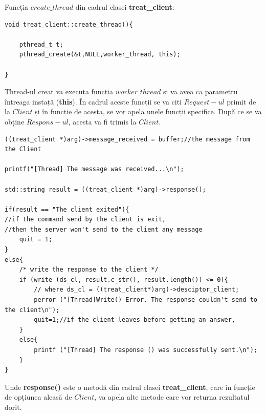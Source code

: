 \documentclass[runningheads]{llncs}
\begin{document}
Funcția $create\_thread$ din cadrul clasei \textbf{treat\_client}: 
\begin{verbatim}
void treat_client::create_thread(){
    
    pthread_t t;
    pthread_create(&t,NULL,worker_thread, this);

}
\end{verbatim}
Thread-ul creat va executa functia $worker\_thread$ și va avea ca parametru 
întreaga instață (\textbf{this}). În cadrul aceste funcții se va citi $Request-ul$ primit de la $Client$ și în funcție de acesta, se vor apela unele funcții specifice.
După ce se va obține $Respons-ul$, acesta va fi trimis la $Client$.
\begin{verbatim}
((treat_client *)arg)->message_received = buffer;//the message from the Client

printf("[Thread] The message was received...\n");

std::string result = ((treat_client *)arg)->response();

if(result == "The client exited"){
//if the command send by the client is exit,
//then the server won't send to the client any message
    quit = 1;
}
else{
    /* write the response to the client */
    if (write (ds_cl, result.c_str(), result.length()) <= 0){
        // where ds_cl = ((treat_client*)arg)->desciptor_client;
        perror ("[Thread]Write() Error. The response couldn't send to the client\n");
        quit=1;//if the client leaves before getting an answer,
    }
    else{
        printf ("[Thread] The response () was successfully sent.\n");
    }
}
\end{verbatim}
Unde \textbf{response()} este o metodă din cadrul clasei \textbf{treat\_client}, care în funcție de opțiunea aleasă de $Client$, va apela alte metode care vor returna rezultatul dorit.
\end{document}
